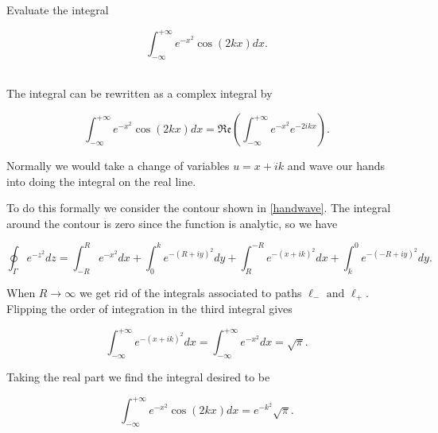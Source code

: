\documentclass[english,a4paper,12pt]{report}
\begin{document}
{Evaluate the integral

\begin{equation}
    \int_{-\infty}^{+\infty} e^{-x^2} \cos (2kx)dx.   
\end{equation}
~
}
{The integral can be rewritten as a complex integral by 

\begin{equation}
    \int_{-\infty}^{+\infty} e^{-x^2} \cos (2kx)dx = \mathfrak{Re} \left( \int_{-\infty}^{+\infty} e^{-x^2} e^{-2ikx}     \right). 
\end{equation}

Normally we would take a change of variables \(u=x+ik\) and wave our hands into doing the integral on the real line. 

To do this formally we consider the contour shown in \cref{handwave}. The integral around the contour is zero since the function is analytic, so we have

\begin{equation}
    \oint_{\Gamma } e^{-z^2} dz = \int_{-R}^{R} e^{-x^2}dx + \int_{0}^{k} e^{-(R+iy)^2}dy + \int_{R}^{-R} e^{-(x+ik)^2} dx + \int_{k}^{0} e^{-(-R+iy)^2} dy.          
\end{equation}

When \(R \to \infty\) we get rid of the integrals associated to paths \(\ell _{-} \text { and } \ell _{+}  \). Flipping the order of integration in the third integral gives 

\begin{equation}
    \int_{-\infty}^{+\infty} e^{-(x+ik)^2} dx  = \int_{-\infty}^{+\infty} e^{-x^2}dx = \sqrt{\pi }.      
\end{equation}

Taking the real part we find the integral desired to be 

\begin{equation}
    \int_{-\infty}^{+\infty} e^{-x^2} \cos (2kx)dx = e^{-k^2}\sqrt{\pi }. 
\end{equation}
~
} 

\end{document}
